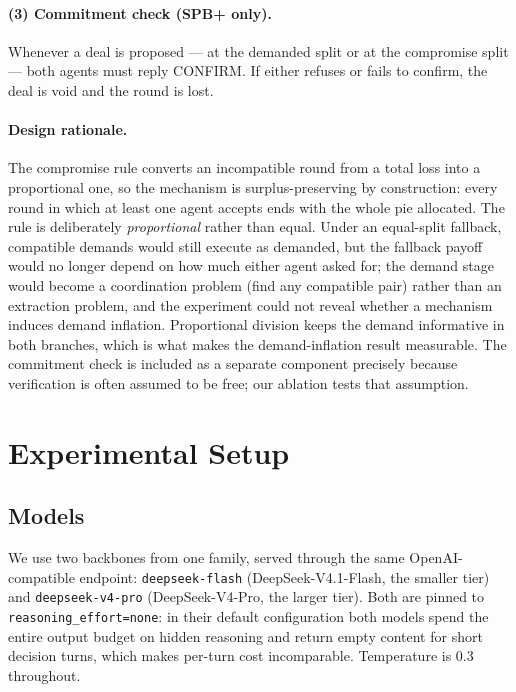 \documentclass[11pt]{article}
\begin{document}
\paragraph{(3) Commitment check (SPB+ only).} Whenever a deal is proposed --- at the demanded split or at the compromise split --- both agents must reply CONFIRM. If either refuses or fails to confirm, the deal is void and the round is lost.

\paragraph{Design rationale.} The compromise rule converts an incompatible round from a total loss into a proportional one, so the mechanism is surplus-preserving by construction: every round in which at least one agent accepts ends with the whole pie allocated. The rule is deliberately \emph{proportional} rather than equal. Under an equal-split fallback, compatible demands would still execute as demanded, but the fallback payoff would no longer depend on how much either agent asked for; the demand stage would become a coordination problem (find any compatible pair) rather than an extraction problem, and the experiment could not reveal whether a mechanism induces demand inflation. Proportional division keeps the demand informative in both branches, which is what makes the demand-inflation result measurable. The commitment check is included as a separate component precisely because verification is often assumed to be free; our ablation tests that assumption.

\section{Experimental Setup}
\label{sec:setup}

\subsection{Models}

We use two backbones from one family, served through the same OpenAI-compatible endpoint: \texttt{deepseek-flash} (DeepSeek-V4.1-Flash, the smaller tier) and \texttt{deepseek-v4-pro} (DeepSeek-V4-Pro, the larger tier). Both are pinned to \texttt{reasoning\_effort=none}: in their default configuration both models spend the entire output budget on hidden reasoning and return empty content for short decision turns, which makes per-turn cost incomparable. Temperature is 0.3 throughout.
\end{document}
